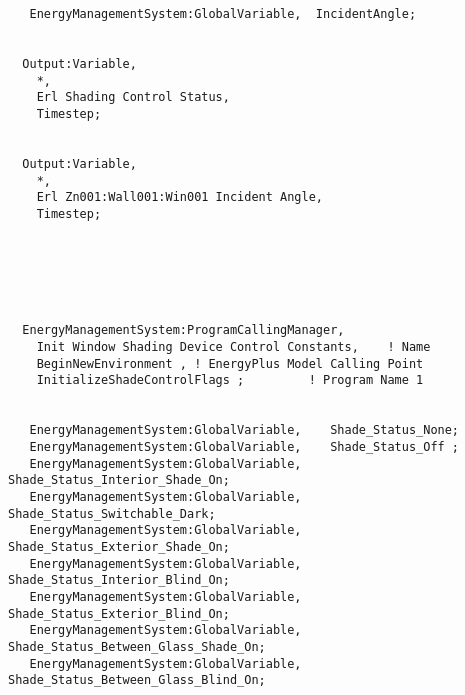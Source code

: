 \begin{lstlisting}
   EnergyManagementSystem:GlobalVariable,  IncidentAngle;


  Output:Variable,
    *,
    Erl Shading Control Status,
    Timestep;


  Output:Variable,
    *,
    Erl Zn001:Wall001:Win001 Incident Angle,
    Timestep;






  EnergyManagementSystem:ProgramCallingManager,
    Init Window Shading Device Control Constants,    ! Name
    BeginNewEnvironment , ! EnergyPlus Model Calling Point
    InitializeShadeControlFlags ;         ! Program Name 1


   EnergyManagementSystem:GlobalVariable,    Shade_Status_None;
   EnergyManagementSystem:GlobalVariable,    Shade_Status_Off ;
   EnergyManagementSystem:GlobalVariable,    Shade_Status_Interior_Shade_On;
   EnergyManagementSystem:GlobalVariable,    Shade_Status_Switchable_Dark;
   EnergyManagementSystem:GlobalVariable,    Shade_Status_Exterior_Shade_On;
   EnergyManagementSystem:GlobalVariable,    Shade_Status_Interior_Blind_On;
   EnergyManagementSystem:GlobalVariable,    Shade_Status_Exterior_Blind_On;
   EnergyManagementSystem:GlobalVariable,    Shade_Status_Between_Glass_Shade_On;
   EnergyManagementSystem:GlobalVariable,    Shade_Status_Between_Glass_Blind_On;





\end{lstlisting}
